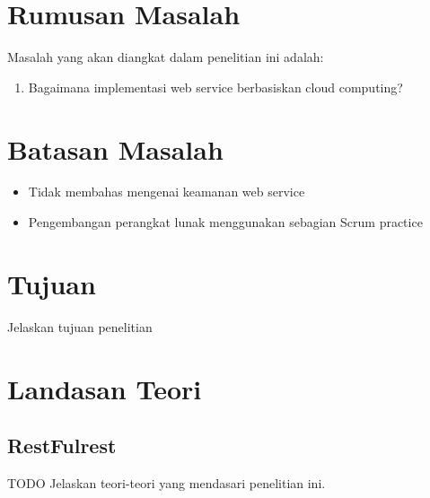 \documentclass[a4paper, 12pt]{report}
\begin{document}
\section*{Rumusan Masalah}
\begin{flushleft}
Masalah yang akan diangkat dalam penelitian ini adalah:
\begin{enumerate}
  \item Bagaimana implementasi web service berbasiskan cloud computing?
\end{enumerate}
\end{flushleft}

\section*{Batasan Masalah}
\begin{flushleft}
\begin{itemize}
  \item Tidak membahas mengenai keamanan web service
  \item Pengembangan perangkat lunak menggunakan sebagian Scrum practice
\end{itemize}
\end{flushleft}

\section*{Tujuan}
\begin{flushleft}
Jelaskan tujuan penelitian
\end{flushleft}

\section*{Landasan Teori}
\subsection*{RestFulrest}
\begin{flushleft}
TODO Jelaskan teori-teori yang mendasari penelitian ini.
\end{flushleft}
\end{document}

